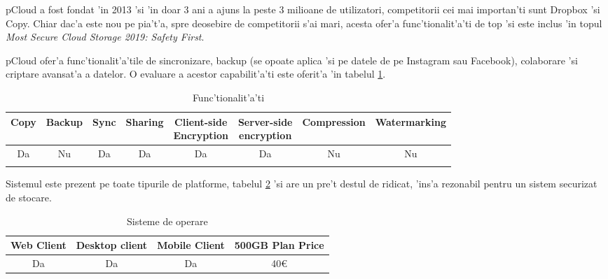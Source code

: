\documentclass[12pt,a4paper,twoside]{report}
\newcommand{\greencheck}{\color{green}  \ding{51}}
\newcommand{\redxmark}{\color{red} \ding{55}}
\begin{document}
pCloud a fost fondat 'in 2013 'si 'in doar 3 ani a ajuns la peste 3 milioane de utilizatori,  competitorii cei mai importan'ti sunt  Dropbox 'si Copy. Chiar dac'a este nou pe pia't'a, spre deosebire de competitorii s'ai mari, acesta ofer'a func'tionalit'a'ti de top 'si este inclus 'in topul \textit{Most Secure Cloud Storage 2019: Safety First}\cite{top_secure}.

pCloud ofer'a func'tionalit'a'tile de sincronizare, backup (se opoate aplica 'si pe datele de pe Instagram sau Facebook), colaborare 'si criptare avansat'a a datelor. O evaluare a acestor capabilit'a'ti este oferit'a 'in tabelul \ref{table:pcloudfeaturetable}.

\begin{table}[H]
\centering
\caption{Func'tionalit'a'ti}
\begin{tabular}{|c|c|c|c|c|c|c|c|}          
\hline               
Copy & Backup & Sync & Sharing & \makecell{Client-side\\Encryption} & \makecell{Server-side\\encryption} & Compression & Watermarking \\ [0.4ex]   
\hline 
Da & Nu & Da & Da & Da & Da & Nu & Nu    \\                      
\greencheck & \redxmark\redxmark & \greencheck & \greencheck & \greencheck\greencheck & \greencheck\greencheck &  \redxmark\redxmark &  \redxmark\redxmark  \\               
\hline                              
\end{tabular}
\label{table:pcloudfeaturetable}             
\end{table}
Sistemul este prezent pe toate tipurile de platforme, tabelul \ref{table:pcloudsystemtable} 'si are un pre't  destul de ridicat, 'ins'a rezonabil pentru un sistem securizat de stocare.
\begin{table}[H]
\centering
\caption{Sisteme de operare}
\begin{tabular}{|c|c|c|c|}          
\hline                      
 Web Client & Desktop client & Mobile Client & 500GB Plan Price\\ [0.5ex]   
\hline                            
Da & Da & Da & 40\euro \\               
\hline                              
\end{tabular}
\label{table:pcloudsystemtable}             
\end{table}
\end{document}
